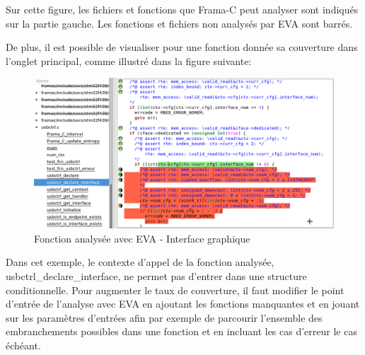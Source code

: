 \noindent Sur cette figure, les fichiers et fonctions que Frama-C peut analyser sont indiqués sur la partie gauche. Les fonctions et fichiers non analysés par EVA sont barrés.

\newpage \noindent
De plus, il est possible de visualiser pour une fonction donnée sa couverture dans l'onglet principal, comme illustré dans la figure suivante:

\begin{figure}[!h]
\centering
\includegraphics[width=16cm]{images/taux_couverture_eva_GUI_fonction.png}
\caption{Fonction analysée avec EVA - Interface graphique}
\label{Fonction analysée avec EVA - Interface graphique}
\end{figure}


\noindent Dans cet exemple, le contexte d'appel de la fonction analysée, usbctrl\_declare\_interface, ne permet pas d'entrer dans une structure conditionnelle. Pour augmenter le taux de couverture, il faut modifier le point d'entrée de l'analyse avec EVA en ajoutant les fonctions manquantes et en jouant sur les paramètres d'entrées afin par exemple de parcourir l'ensemble des embranchements possibles dans une fonction et en incluant les cas d'erreur le cas échéant.


